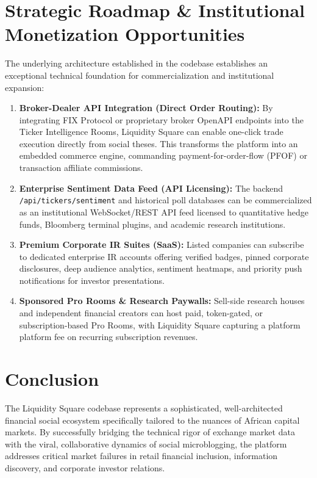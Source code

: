 \documentclass[11pt,a4paper]{article}
\begin{document}
\section{Strategic Roadmap \& Institutional Monetization Opportunities}

The underlying architecture established in the codebase establishes an exceptional technical foundation for commercialization and institutional expansion:

\begin{enumerate}
    \item \textbf{Broker-Dealer API Integration (Direct Order Routing):}
    By integrating FIX Protocol or proprietary broker OpenAPI endpoints into the Ticker Intelligence Rooms, Liquidity Square can enable one-click trade execution directly from social theses. This transforms the platform into an embedded commerce engine, commanding payment-for-order-flow (PFOF) or transaction affiliate commissions.
    \item \textbf{Enterprise Sentiment Data Feed (API Licensing):}
    The backend \texttt{/api/tickers/sentiment} and historical poll databases can be commercialized as an institutional WebSocket/REST API feed licensed to quantitative hedge funds, Bloomberg terminal plugins, and academic research institutions.
    \item \textbf{Premium Corporate IR Suites (SaaS):}
    Listed companies can subscribe to dedicated enterprise IR accounts offering verified badges, pinned corporate disclosures, deep audience analytics, sentiment heatmaps, and priority push notifications for investor presentations.
    \item \textbf{Sponsored Pro Rooms \& Research Paywalls:}
    Sell-side research houses and independent financial creators can host paid, token-gated, or subscription-based Pro Rooms, with Liquidity Square capturing a platform platform fee on recurring subscription revenues.
\end{enumerate}

\section{Conclusion}

The Liquidity Square codebase represents a sophisticated, well-architected financial social ecosystem specifically tailored to the nuances of African capital markets. By successfully bridging the technical rigor of exchange market data with the viral, collaborative dynamics of social microblogging, the platform addresses critical market failures in retail financial inclusion, information discovery, and corporate investor relations.
\end{document}
